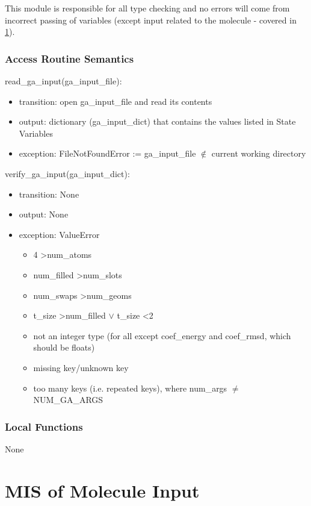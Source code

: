 \documentclass[12pt, titlepage]{article}
\begin{document}
This module is responsible for all type checking and no errors will come from 
incorrect passing of variables (except input related to the molecule - covered 
in \ref{section-mol_input}).

\subsubsection{Access Routine Semantics}

\noindent read\_ga\_input(ga\_input\_file):
\begin{itemize}
	\item transition: open ga\_input\_file and read its contents
	\item output: dictionary (ga\_input\_dict) that contains the values listed 
	in State Variables
	\item exception: FileNotFoundError := ga\_input\_file $\notin$ current 
	working 
	directory
\end{itemize}

\noindent verify\_ga\_input(ga\_input\_dict):
\begin{itemize}
	\item transition: None
	\item output: None
	\item exception: ValueError
	\begin{itemize}
		\item 4 \textgreater num\_atoms
		\item num\_filled \textgreater num\_slots
		\item num\_swaps \textgreater num\_geoms
		\item t\_size \textgreater num\_filled $\lor$ t\_size \textless 2
		\item not an integer type (for all except coef\_energy and coef\_rmsd, 
		which should be floats)
		\item missing key/unknown key
		\item too many keys (i.e. repeated keys), where num\_args $\neq$ 
		NUM\_GA\_ARGS 
	\end{itemize}
\end{itemize}

\subsubsection{Local Functions}

None

\newpage

\section{MIS of Molecule Input} \label{section-mol_input}
\end{document}
